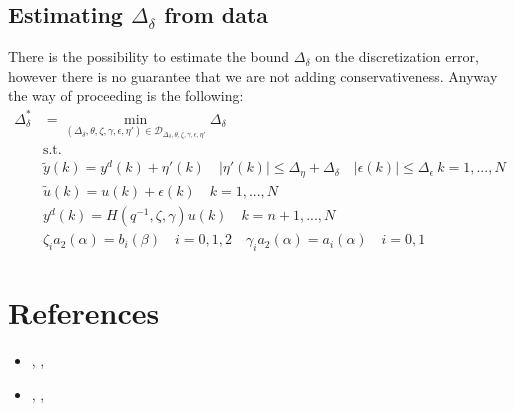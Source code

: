 \subsection{Estimating $\Delta_\delta$ from data}
There is the possibility to estimate the bound $\Delta_\delta$ on the discretization error, however there is no guarantee that we are not adding conservativeness. Anyway the way of proceeding is the following:
\begin{equation}
    \begin{aligned}
        \Delta_\delta^*&=\min_{(\Delta_\delta,\theta,\zeta,\gamma,\epsilon,\eta')\in\mathcal{D}_{\Delta_\delta,\theta,\zeta,\gamma,\epsilon,\eta'}} \Delta_\delta\\
        &\text{s.t.} \\
        &\tilde{y}(k)=y^d(k)+\eta'(k) \quad 
          \vert \eta'(k) \vert \le \Delta_\eta+\Delta_\delta \quad
        \vert \epsilon(k) \vert \le \Delta_\epsilon \ k=1,...,N\\
    &\tilde{u}(k)=u(k)+\epsilon(k) \quad k=1,...,N\\
    &y^d(k)=H(q^{-1},\zeta,\gamma)u(k) \quad 
    k=n+1,...,N\\
    &
    \zeta_i a_2(\alpha)=b_i(\beta) \quad i=0,1,2   \quad \gamma_i a_2(\alpha)=a_i(\alpha) \quad i=0,1
    \end{aligned}
\end{equation}

\section*{References}
\begin{itemize}
    \itemsep-0.3em
    \item[\Large{\ding{45}}]  , \textit{}, 
    \item[\Large{\ding{45}}]  , \textit{}, 
\end{itemize}